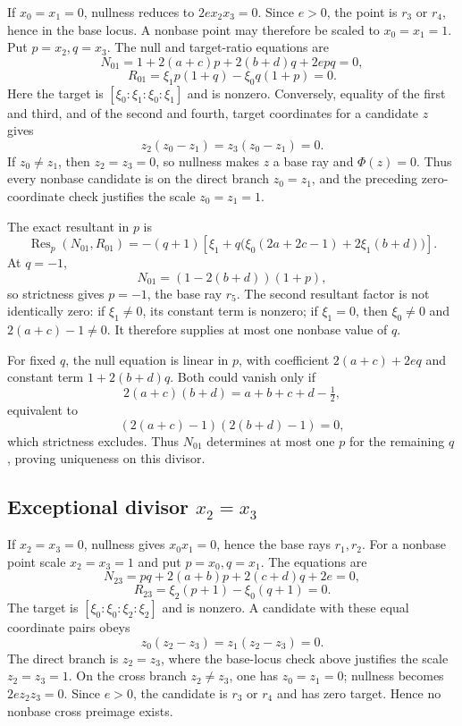 If \(x_0=x_1=0\), nullness reduces to \(2e x_2x_3=0\). Since \(e>0\),
the point is \(r_3\) or \(r_4\), hence in the base locus. A nonbase point may
therefore be scaled to \(x_0=x_1=1\). Put \(p=x_2,q=x_3\). The null and
target-ratio equations are
\[
N_{01}=1+2(a+c)p+2(b+d)q+2epq=0,
\]
\[
R_{01}=\xi_1p(1+q)-\xi_0q(1+p)=0.
\]
Here the target is
\([\xi_0:\xi_1:\xi_0:\xi_1]\) and is nonzero. Conversely, equality of the
first and third, and of the second and fourth, target coordinates for a
candidate \(z\) gives
\[
z_2(z_0-z_1)=z_3(z_0-z_1)=0.
\]
If \(z_0\ne z_1\), then \(z_2=z_3=0\), so nullness makes \(z\) a base ray and
\(\Phi(z)=0\). Thus every nonbase candidate is on the direct branch
\(z_0=z_1\), and the preceding zero-coordinate check justifies the scale
\(z_0=z_1=1\).

The exact resultant in \(p\) is
\[
\operatorname{Res}_p(N_{01},R_{01})
=-(q+1)\left[
\xi_1+q\bigl(\xi_0(2a+2c-1)+2\xi_1(b+d)\bigr)
\right].
\]
At \(q=-1\),
\[
N_{01}=(1-2(b+d))(1+p),
\]
so strictness gives \(p=-1\), the base ray \(r_5\). The second resultant
factor is not identically zero: if \(\xi_1\ne0\), its constant term is
nonzero; if \(\xi_1=0\), then \(\xi_0\ne0\) and
\(2(a+c)-1\ne0\). It therefore supplies at most one nonbase value of \(q\).

For fixed \(q\), the null equation is linear in \(p\), with coefficient
\(2(a+c)+2eq\) and constant term \(1+2(b+d)q\). Both could vanish only if
\[
2(a+c)(b+d)=a+b+c+d-\tfrac12,
\]
equivalent to
\[
(2(a+c)-1)(2(b+d)-1)=0,
\]
which strictness excludes.
Thus \(N_{01}\) determines at most one \(p\) for the remaining \(q\), proving
uniqueness on this divisor.

\subsection[Exceptional divisor x2=x3]{Exceptional divisor \(x_2=x_3\)}

If \(x_2=x_3=0\), nullness gives \(x_0x_1=0\), hence the base rays
\(r_1,r_2\). For a nonbase point scale \(x_2=x_3=1\) and put
\(p=x_0,q=x_1\). The equations are
\[
N_{23}=pq+2(a+b)p+2(c+d)q+2e=0,
\]
\[
R_{23}=\xi_2(p+1)-\xi_0(q+1)=0.
\]
The target is
\([\xi_0:\xi_0:\xi_2:\xi_2]\) and is nonzero. A candidate with these equal
coordinate pairs obeys
\[
z_0(z_2-z_3)=z_1(z_2-z_3)=0.
\]
The direct branch is \(z_2=z_3\), where the base-locus check above justifies
the scale \(z_2=z_3=1\). On the cross branch \(z_2\ne z_3\), one has
\(z_0=z_1=0\); nullness becomes \(2ez_2z_3=0\). Since \(e>0\), the candidate
is \(r_3\) or \(r_4\) and has zero target. Hence no nonbase cross preimage
exists.

